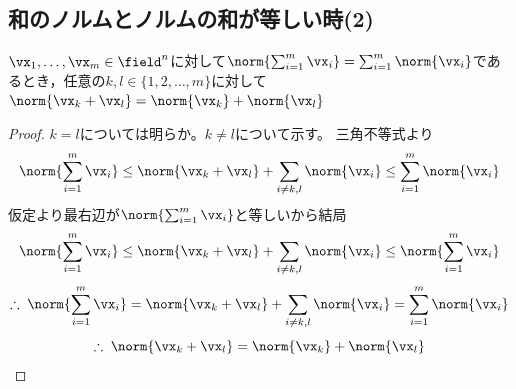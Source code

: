         \subsection{和のノルムとノルムの和が等しい時(2)}
            \begin{shadebox}
                $\vx_1,\dotsc,\vx_m\in\field^n$に対して$\norm{\sum_{i=1}^{m}{\vx_i}}=\sum_{i=1}^{m}{\norm{\vx_i}}$であるとき，任意の$k,l\in\{1,2,\dotsc,m\}$に対して$\norm{\vx_k+\vx_l}=\norm{\vx_k}+\norm{\vx_l}$
            \end{shadebox}
            \begin{proof}
                $k=l$については明らか。$k\neq l$について示す。
                三角不等式より
                \[\norm{\sum_{i=1}^{m}{\vx_i}} \leq \norm{\vx_k+\vx_l} + \sum_{i\neq k,l}{\norm{\vx_i}} \leq \sum_{i=1}^{m}{\norm{\vx_i}}\]
                仮定より最右辺が$\norm{\sum_{i=1}^{m}{\vx_i}}$と等しいから結局
                \[\norm{\sum_{i=1}^{m}{\vx_i}} \leq \norm{\vx_k+\vx_l} + \sum_{i\neq k,l}{\norm{\vx_i}} \leq \norm{\sum_{i=1}^{m}{\vx_i}}\]
                \[\therefore\; \norm{\sum_{i=1}^{m}{\vx_i}} = \norm{\vx_k+\vx_l} + \sum_{i\neq k,l}{\norm{\vx_i}} = \sum_{i=1}^{m}{\norm{\vx_i}}\]
                \[\therefore\; \norm{\vx_k+\vx_l} = \norm{\vx_k}+\norm{\vx_l}\]
            \end{proof}
